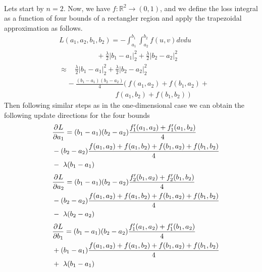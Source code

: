 \\
Lets start by $n=2$. Now, we have $f: \mathbb{R}^{2} \rightarrow (0,1)$, and we define the loss integral as a function of four bounds of a rectangler region and apply the trapezoidal approximation as follows.
\begin{equation}
\begin{aligned} 
&L(a_{1},a_{2},b_{1},b_{2}) = - \int_{a_{1}}^{b_{1}}\int_{a_{2}}^{b_{2}}f(u,v)dvdu \\&~~~~~~~~~~~~~~~~~~~~~~~~+ \frac{\lambda}{2} \left| b_1 -a_1 \right|_{2}^{2} + \frac{\lambda}{2} \left| b_2 -a_2 \right|_{2}^{2}  \\
&\approx ~~~~ \frac{\lambda}{2} \left| b_1 -a_1 \right|_{2}^{2} + \frac{\lambda}{2} \left| b_2 -a_2 \right|_{2}^{2}  \\&~~~~~- \frac{(b_{1}-a_{1})(b_{2}-a_{2})}{4}\Big( ~f(a_{1},a_{2})+f(b_{1},a_{2})+\\ &~~~~~~~~~~~~~~~~~~~~~~~~~~~~~~~~~~~~f(a_{1},b_{2})+f(b_{1},b_{2})~ \Big)
\label{eq:trapezoidal-integration2}
\end{aligned}
\end{equation}
Then following similar steps as in the one-dimensional case we can obtain the following update directions for the four bounds 
\begin{equation}
\begin{aligned} 
~~~~&\frac{\partial^{} L}{\partial a_{1}} = (b_{1}-a_{1})(b_{2}-a_{2})\frac{f^{\prime}_{1}(a_{1},a_{2}) + f^{\prime}_{1}(a_{1},b_{2})}{4}\\ &-(b_{2} - a_{2})\frac{f(a_{1},a_{2}) + f(a_{1},b_{2}) + f(b_{1},a_{2}) + f(b_{1},b_{2}) }{4} \\ &-~ \lambda (b_1-a_1)
\label{eq:update-trap-2-1}
\end{aligned}
\end{equation}
\begin{equation}
\begin{aligned} 
~~~~&\frac{\partial^{} L}{\partial a_{2}} = (b_{1}-a_{1})(b_{2}-a_{2})\frac{f^{\prime}_{2}(b_{1},a_{2}) + f^{\prime}_{2}(b_{1},b_{2})}{4}\\ &-(b_{2} - a_{2})\frac{f(a_{1},a_{2}) + f(a_{1},b_{2}) + f(b_{1},a_{2}) + f(b_{1},b_{2}) }{4}  \\ &-~ \lambda (b_2-a_2)
\label{eq:update-trap-2-2}
\end{aligned}
\end{equation}
\begin{equation}
\begin{aligned} 
~~~~&\frac{\partial^{} L}{\partial b_{1}} = (b_{1}-a_{1})(b_{2}-a_{2})\frac{f^{\prime}_{1}(a_{1},a_{2}) + f^{\prime}_{1}(b_{1},a_{2})}{4}\\ &+(b_{1} - a_{1})\frac{f(a_{1},a_{2}) + f(a_{1},b_{2}) + f(b_{1},a_{2}) + f(b_{1},b_{2}) }{4}  \\ &+~ \lambda (b_1-a_1)
\label{eq:update-trap-2-3}
\end{aligned}
\end{equation}
